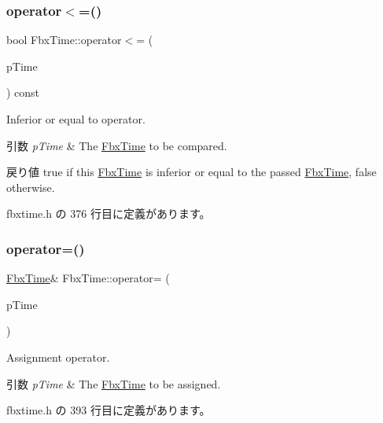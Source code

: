\subsubsection{\texorpdfstring{operator$<$=()}{operator<=()}}
{\footnotesize\ttfamily bool Fbx\+Time\+::operator$<$= (\begin{DoxyParamCaption}\item[{const \hyperlink{class_fbx_time}{Fbx\+Time} \&}]{p\+Time }\end{DoxyParamCaption}) const\hspace{0.3cm}{\ttfamily [inline]}}

Inferior or equal to operator. 
\begin{DoxyParams}{引数}
{\em p\+Time} & The \hyperlink{class_fbx_time}{Fbx\+Time} to be compared. \\
\hline
\end{DoxyParams}
\begin{DoxyReturn}{戻り値}
{\ttfamily true} if this \hyperlink{class_fbx_time}{Fbx\+Time} is inferior or equal to the passed \hyperlink{class_fbx_time}{Fbx\+Time}, {\ttfamily false} otherwise. 
\end{DoxyReturn}


 fbxtime.\+h の 376 行目に定義があります。

\mbox{\label{class_fbx_time_aeef6e0d32d6a33499cf8a8c87723115b}} 
\subsubsection{\texorpdfstring{operator=()}{operator=()}}
{\footnotesize\ttfamily \hyperlink{class_fbx_time}{Fbx\+Time}\& Fbx\+Time\+::operator= (\begin{DoxyParamCaption}\item[{const \hyperlink{class_fbx_time}{Fbx\+Time} \&}]{p\+Time }\end{DoxyParamCaption})\hspace{0.3cm}{\ttfamily [inline]}}

Assignment operator. 
\begin{DoxyParams}{引数}
{\em p\+Time} & The \hyperlink{class_fbx_time}{Fbx\+Time} to be assigned. \\
\hline
\end{DoxyParams}


 fbxtime.\+h の 393 行目に定義があります。

